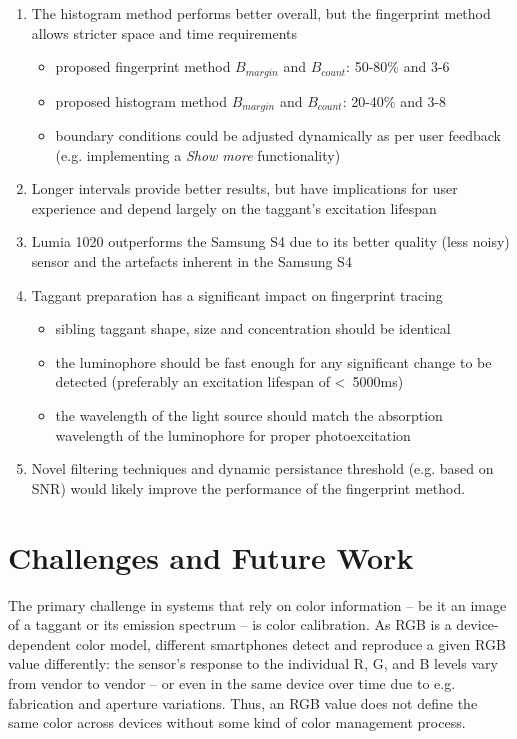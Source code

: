 \documentclass[thesis.tex]{subfiles}
\begin{document}
\begin{enumerate}
  \item The histogram method performs better overall, but the fingerprint method allows stricter space and time requirements
    \begin{itemize}
      \item proposed fingerprint method $B_{margin}$ and $B_{count}$: 50-80\% and 3-6
      \item proposed histogram method $B_{margin}$ and $B_{count}$: 20-40\% and 3-8
      \item boundary conditions could be adjusted dynamically as per user feedback (e.g. implementing a \emph{Show more} functionality)
    \end{itemize}
  \item Longer intervals provide better results, but have implications for user experience and depend largely on the taggant's excitation lifespan
  \item Lumia 1020 outperforms the Samsung S4 due to its better quality (less noisy) sensor and the artefacts inherent in the Samsung S4
  \item Taggant preparation has a significant impact on fingerprint tracing
    \begin{itemize}
      \item sibling taggant shape, size and concentration should be identical
      \item the luminophore should be fast enough for any significant change to be detected (preferably an excitation lifespan of \textless\ 5000ms)
      \item the wavelength of the light source should match the absorption wavelength of the luminophore for proper photoexcitation
    \end{itemize}
  \item Novel filtering techniques and dynamic persistance threshold (e.g. based on SNR) would likely improve the performance of the fingerprint method.
\end{enumerate}

\section{Challenges and Future Work}

The primary challenge in systems that rely on color information -- be it an image of a taggant or its emission spectrum -- is color calibration. As RGB is a device-dependent color model, different smartphones detect and reproduce a given RGB value differently: the sensor's response to the individual R, G, and B levels vary from vendor to vendor -- or even in the same device over time due to e.g. fabrication and aperture variations. Thus, an RGB value does not define the same color across devices without some kind of color management process.
\end{document}
